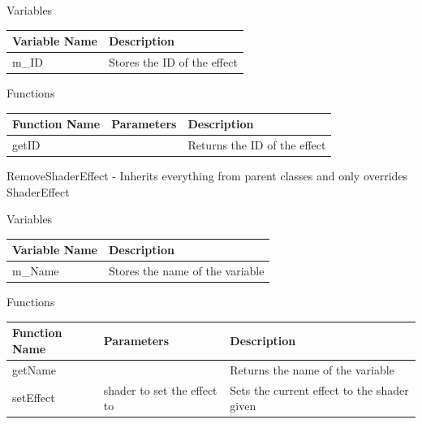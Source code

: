 \documentclass{article}
\begin{document}
                \begin{center}
                    Variables
                    \begin{tabular}{ | m{} | m{} | }
                        \hline
                        \textbf{Variable Name} & \textbf{Description} \\
                        \hline
                        m\_ID & Stores the ID of the effect \\
                        \hline
                    \end{tabular}
                    Functions
                    \begin{tabular}{ | m{} | m{}| m{} | }
                        \hline
                        \textbf{Function Name} & \textbf{Parameters} & \textbf{Description} \\
                        \hline
                        getID & & Returns the ID of the effect \\
                        \hline
                    \end{tabular}
                \end{center}
                RemoveShaderEffect - Inherits everything from parent classes and only overrides \\
                ShaderEffect
                \begin{center}
                    Variables
                    \begin{tabular}{ | m{} | m{} | }
                        \hline
                        \textbf{Variable Name} & \textbf{Description} \\
                        \hline
                        m\_Name & Stores the name of the variable \\
                        \hline
                    \end{tabular}
                    Functions
                    \begin{tabular}{ | m{} | m{}| m{} | }
                        \hline
                        \textbf{Function Name} & \textbf{Parameters} & \textbf{Description} \\
                        \hline
                        getName & & Returns the name of the variable \\
                        \hline
                        setEffect & shader to set the effect to & Sets the current effect to the shader given \\
                        \hline
                    \end{tabular}
                \end{center}
\end{document}
